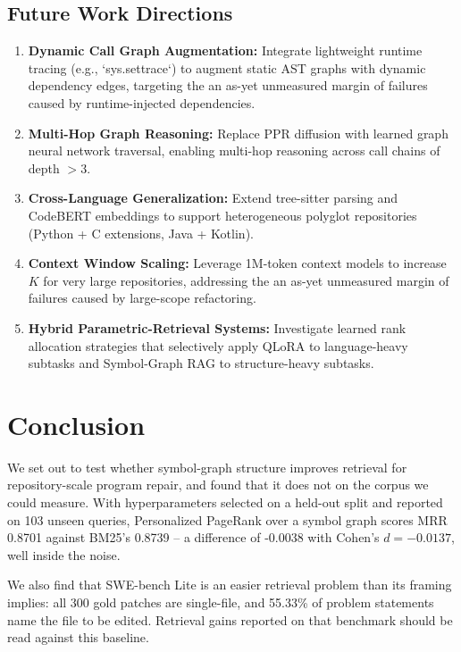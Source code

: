 \documentclass[10pt,journal,compsoc,twocolumn]{IEEEtran}
\begin{document}
\subsection{Future Work Directions}


\begin{enumerate}
  \item \textbf{Dynamic Call Graph Augmentation:} Integrate lightweight runtime tracing (e.g., `sys.settrace`) to augment static AST graphs with dynamic dependency edges, targeting the an as-yet unmeasured margin of failures caused by runtime-injected dependencies.
  \item \textbf{Multi-Hop Graph Reasoning:} Replace PPR diffusion with learned graph neural network traversal, enabling multi-hop reasoning across call chains of depth $> 3$.
  \item \textbf{Cross-Language Generalization:} Extend tree-sitter parsing and CodeBERT embeddings to support heterogeneous polyglot repositories (Python + C extensions, Java + Kotlin).
  \item \textbf{Context Window Scaling:} Leverage 1M-token context models to increase $K$ for very large repositories, addressing the an as-yet unmeasured margin of failures caused by large-scope refactoring.
  \item \textbf{Hybrid Parametric-Retrieval Systems:} Investigate learned rank allocation strategies that selectively apply QLoRA to language-heavy subtasks and Symbol-Graph RAG to structure-heavy subtasks.
\end{enumerate}




\section{Conclusion}


We set out to test whether symbol-graph structure improves retrieval for repository-scale program repair, and found that it does not on the corpus we could measure. With hyperparameters selected on a held-out split and reported on 103 unseen queries, Personalized PageRank over a symbol graph scores MRR 0.8701 against BM25's 0.8739 -- a difference of -0.0038 with Cohen's $d = -0.0137$, well inside the noise.

We also find that SWE-bench Lite is an easier retrieval problem than its framing implies: all 300 gold patches are single-file, and 55.33\% of problem statements name the file to be edited. Retrieval gains reported on that benchmark should be read against this baseline.
\end{document}
